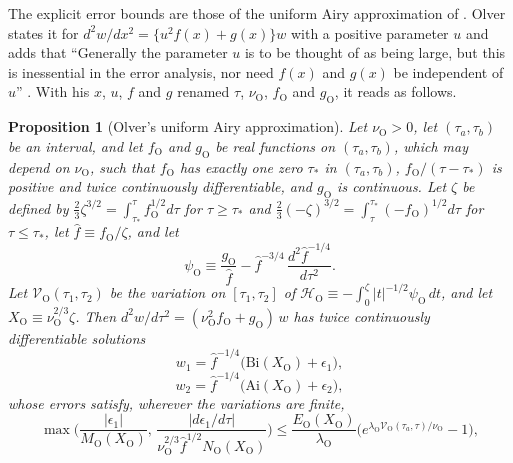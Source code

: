 \documentclass[aps,prd,onecolumn,tightenlines,nofootinbib,notitlepage,11pt,floatfix]{revtex4-2}
\theoremstyle{indentedtheorem}
\newtheorem{proposition}{Proposition}
\begin{document}
The explicit error bounds are those of the uniform Airy approximation of \citet{Olver1974Asymptotics}. Olver states it for $d^2w/dx^2=\{u^2f(x)+g(x)\}w$ with a positive parameter $u$ and adds that ``Generally the parameter $u$ is to be thought of as being large, but this is inessential in the error analysis, nor need $f(x)$ and $g(x)$ be independent of $u$'' \citep[Ch.~11, \S3.1, p.~398]{Olver1974Asymptotics}. With his $x$, $u$, $f$ and $g$ renamed $\tau$, $\nu_\text{O}$, $f_\text{O}$ and $g_\text{O}$, it reads as follows.

\begin{proposition}[Olver's uniform Airy approximation]\label{prop:olver}
Let $\nu_\text{O}>0$, let $(\tau_a,\tau_b)$ be an interval, and let $f_\text{O}$ and $g_\text{O}$ be real functions on $(\tau_a,\tau_b)$, which may depend on $\nu_\text{O}$, such that $f_\text{O}$ has exactly one zero $\tau_*$ in $(\tau_a,\tau_b)$, $f_\text{O}/(\tau-\tau_*)$ is positive and twice continuously differentiable, and $g_\text{O}$ is continuous. Let $\zeta$ be defined by $\tfrac{2}{3}\zeta^{3/2}=\int_{\tau_*}^\tau f_\text{O}^{1/2}d\tau$ for $\tau\geq\tau_*$ and $\tfrac{2}{3}(-\zeta)^{3/2}=\int_\tau^{\tau_*}(-f_\text{O})^{1/2}d\tau$ for $\tau\leq\tau_*$, let $\hat{f}\equiv f_\text{O}/\zeta$, and let
\begin{equation*}
    \psi_\text{O} \equiv \frac{g_\text{O}}{\hat{f}}-\hat{f}^{-3/4}\,\frac{d^2\hat{f}^{-1/4}}{d\tau^2} .
\end{equation*}
Let $\mathcal{V}_\text{O}(\tau_1,\tau_2)$ be the variation on $[\tau_1,\tau_2]$ of $\mathcal{H}_\text{O}\equiv-\int_0^\zeta|t|^{-1/2}\psi_\text{O}\,dt$, and let $X_\text{O}\equiv\nu_\text{O}^{2/3}\zeta$. Then $d^2w/d\tau^2=(\nu_\text{O}^2f_\text{O}+g_\text{O})\,w$ has twice continuously differentiable solutions
\begin{equation*}
    w_1 = \hat{f}^{-1/4}\big(\mathrm{Bi}(X_\text{O})+\epsilon_1\big) ,
\end{equation*}
\begin{equation*}
    w_2 = \hat{f}^{-1/4}\big(\mathrm{Ai}(X_\text{O})+\epsilon_2\big) ,
\end{equation*}
whose errors satisfy, wherever the variations are finite,
\begin{equation*}
    \max\Big(\frac{|\epsilon_1|}{M_\text{O}(X_\text{O})},\,\frac{|d\epsilon_1/d\tau|}{\nu_\text{O}^{2/3}\hat{f}^{1/2}N_\text{O}(X_\text{O})}\Big) \leq \frac{E_\text{O}(X_\text{O})}{\lambda_\text{O}}\Big(e^{\lambda_\text{O}\mathcal{V}_\text{O}(\tau_a,\tau)/\nu_\text{O}}-1\Big) ,
\end{equation*}

\end{proposition}
\end{document}
